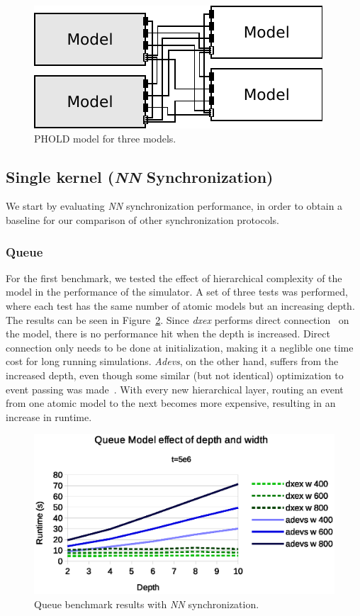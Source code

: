 \begin{figure}
    \center
	\includegraphics[width=\modelfraction\columnwidth]{fig/phold_model.pdf}
	\caption{PHOLD model for three models.}
	\label{fig:PHOLD_model}
\end{figure}

\subsection{Single kernel (\textit{NN} Synchronization)}
We start by evaluating \textit{NN} synchronization performance, in order to obtain a baseline for our comparison of other synchronization protocols.

\subsubsection{Queue}
\label{4-seq-Queue}
For the first benchmark, we tested the effect of hierarchical complexity of the model in the performance of the simulator.
A set of three tests was performed, where each test has the same number of atomic models but an increasing depth.
The results can be seen in Figure~\ref{fig:Queue_benchmark_seq}.
Since \textit{dxex} performs direct connection~\cite{SymbolicFlattening} on the model, there is no performance hit when the depth is increased.
Direct connection only needs to be done at initialization, making it a neglible one time cost for long running simulations.
\textit{Adevs}, on the other hand, suffers from the increased depth, even though some similar (but not identical) optimization to event passing was made~\cite{adevs_opt}.
With every new hierarchical layer, routing an event from one atomic model to the next becomes more expensive, resulting in an increase in runtime.

\begin{figure}
	\center
	\includegraphics[width=\columnwidth]{fig/queue_fixed_sequential.eps}
	\caption{Queue benchmark results with \textit{NN} synchronization.}
	\label{fig:Queue_benchmark_seq}
\end{figure}

